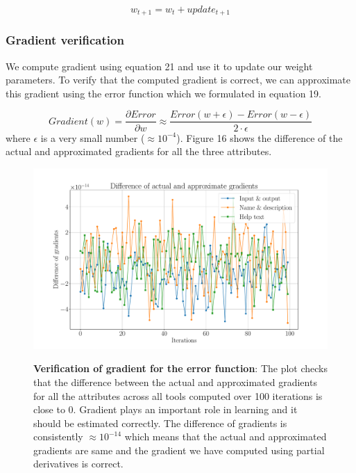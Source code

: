 \begin{equation}
w_{t+1} = w_t + update_{t+1}
\end{equation}

\subsubsection{Gradient verification}
We compute gradient using equation 21 and use it to update our weight parameters. To verify that the computed gradient is correct, we can approximate this gradient using the error function which we formulated in equation 19.

\begin{equation}
Gradient(w) = \frac{\partial Error}{\partial w} \approx \frac{Error(w + \epsilon) - Error(w - \epsilon)}{2 \cdot \epsilon} 
\end{equation}
where $\epsilon$ is a very small number ($\approx10^{-4}$). Figure 16 shows the difference of the actual and approximated gradients for all the three attributes.

\begin{figure}[h]
\begin{centering}
    {\includegraphics[scale=0.37]{figures/Difference_gradients.pdf}}
    \caption[Verification of gradient for the error function]{\textbf{Verification of gradient for the error function}: The plot checks that the difference between the actual and approximated gradients for all the attributes across all tools computed over 100 iterations is close to 0. Gradient plays an important role in learning and it should be estimated correctly. The difference of gradients is consistently $\approx 10^{-14}$ which means that the actual and approximated gradients are same and the gradient we have computed using partial derivatives is correct.}
\end{centering}
\end{figure}